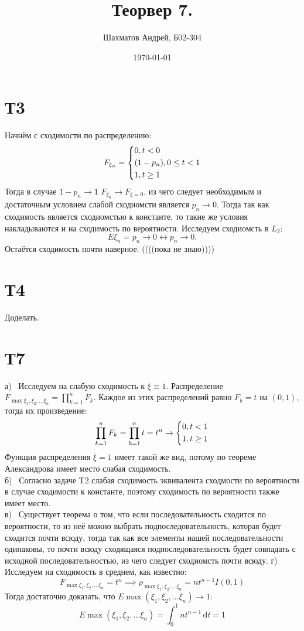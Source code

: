 \documentclass[12pt]{article}
\title{Теорвер 7.}
\author{Шахматов Андрей, Б02-304}
\date{\today}
\begin{document}
\maketitle
\tableofcontents

\section{Т3}
Начнём с сходимости по распределению:
\[
    F_{\xi_n} = 
    \begin{dcases}
        0, t < 0 \\
        (1 - p_n), 0 \leq t < 1 \\
        1, t \geq 1
    \end{dcases}
\]
Тогда в случае $1 - p_n \to 1$ $F_{\xi_n} \to F_{\xi = 0}$, из чего следует необходимым и достаточным условием 
слабой сходиомсти является $p_n \to 0$. Тогда так как сходимость является сходиомстью к константе, то такие же 
условия накладываются и на сходимость по вероятности. 
Исследуем сходиомсть в $L_2$: 
\[
    E \xi_n = p_n \to 0 \leftrightarrow p_n \to 0. 
\]    
Остаётся сходимость почти наверное. ((((пока не знаю))))

\section{Т4}
Доделать.


\section{Т7}
а) \, Исследуем на слабую сходимость к $\xi \equiv 1$. 
Распределение $F_{\max \xi_1, \xi_2, \dots \xi_n} = \prod_{k=1}^{n} F_k$. 
Каждое из этих распределений равно $F_k = t$ на $(0, 1)$, тогда их произведение: 
\[
    \prod_{k=1}^n F_k = \prod_{k=1}^n t = t^n \to 
    \begin{dcases}
        0, t < 1 \\
        1, t \geq 1
    \end{dcases}
\]  
Функция распределения $\xi = 1$ имеет такой же вид, потому по теореме Александрова имеет место слабая 
сходимость. \\
б) \, Согласно задаче T2 слабая сходимость эквивалента сходмости по вероятности в случае сходимости к константе, 
поэтому сходимость по вероятности также имеет место. \\
в) \, Существует теорема о том, что если последовательность сходится по вероятности, то из неё можно 
выбрать подпоследовательность, которая будет сходится почти всюду, тогда так как все элементы нашей последовательности 
одинаковы, то почти всюду сходящаяся подпоследовательность будет совпадать с исходной последовательностью, из чего следует 
сходиомсть почти всюду. 
г) \, Исследуем на сходимость в среднем, как известно: 
\[
    F_{\max \xi_1, \xi_2, \dots \xi_n} = t^n \implies \rho_{\max \xi_1, \xi_2, \dots \xi_n} = 
    n t^{n-1} I(0, 1)
\] 
Тогда достаточно доказать, что $E \max (\xi_1, \xi_2, \dots \xi_n) \to 1$: 
\[
    E \max (\xi_1, \xi_2, \dots \xi_n) = \int_{0}^{1} n t^{n-1} \,\mathrm{d}t = 1
\]
\end{document}

